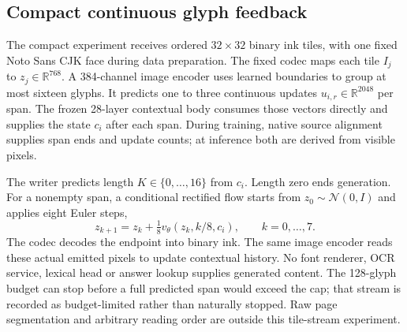 \subsection*{Compact continuous glyph feedback}
The compact experiment receives ordered $32\times32$ binary ink tiles, with
one fixed Noto Sans CJK face during data preparation. The fixed codec maps
each tile $I_j$ to $z_j\in\mathbb R^{768}$. A 384-channel image encoder uses
learned boundaries to group at most sixteen glyphs. It predicts one to three
continuous updates $u_{i,r}\in\mathbb R^{2048}$ per span. The frozen 28-layer
contextual body consumes those vectors directly and supplies the state $c_i$
after each span. During training, native source alignment supplies span ends
and update counts; at inference both are derived from visible pixels.

The writer predicts length $K\in\{0,\ldots,16\}$ from $c_i$. Length zero ends
generation. For a nonempty span, a conditional rectified flow starts from
$z_0\sim\mathcal N(0,I)$ and applies eight Euler steps,
\begin{equation}
 z_{k+1}=z_k+\tfrac18 v_\theta(z_k,k/8,c_i),\qquad k=0,\ldots,7.
\end{equation}
The codec decodes the endpoint into binary ink. The same image encoder reads
these actual emitted pixels to update contextual history. No font renderer,
OCR service, lexical head or answer lookup supplies generated content. The
128-glyph budget can stop before a full predicted span would exceed the cap;
that stream is recorded as budget-limited rather than naturally stopped.
Raw page segmentation and arbitrary reading order are outside this tile-stream
experiment.

